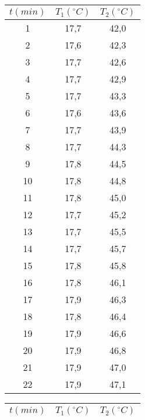 \documentclass[12pt, a4paper, titlepage]{article}
\begin{document}
  \begin{table}[H] 
    \centering
    \begin{minipage}[c]{0,4\textwidth}
      \begin{table}[H]
        \centering
        \begin{tabular}{|c|c|c|}
        \hline
        $t(min)$  & $T_1 (^{\circ} C)$ & $T_2 (^{\circ} C)$ \\ \hline
        1  & 17,7 & 42,0 \\ \hline
        2  & 17,6 & 42,3 \\ \hline
        3  & 17,7 & 42,6 \\ \hline
        4  & 17,7 & 42,9 \\ \hline
        5  & 17,7 & 43,3 \\ \hline
        6  & 17,6 & 43,6 \\ \hline
        7  & 17,7 & 43,9 \\ \hline
        8  & 17,7 & 44,3 \\ \hline
        9  & 17,8 & 44,5 \\ \hline
        10 & 17,8 & 44,8 \\ \hline
        11 & 17,8 & 45,0 \\ \hline
        12 & 17,7 & 45,2 \\ \hline
        13 & 17,7 & 45,5 \\ \hline
        14 & 17,7 & 45,7 \\ \hline
        15 & 17,8 & 45,8 \\ \hline
        16 & 17,8 & 46,1 \\ \hline
        17 & 17,9 & 46,3 \\ \hline
        18 & 17,8 & 46,4 \\ \hline
        19 & 17,9 & 46,6 \\ \hline
        20 & 17,9 & 46,8 \\ \hline
        21 & 17,9 & 47,0 \\ \hline
        22 & 17,9 & 47,1 \\ \hline
        \end{tabular}
      \end{table}
    \end{minipage}
    \begin{minipage}[c]{0,4\textwidth}
      \begin{table}[H]
        \centering
        \begin{tabular}{|c|c|c|}
        \hline
        $t(min)$  & $T_1 (^{\circ} C)$ & $T_2 (^{\circ} C)$ \\ \hline

\end{tabular}
\end{table}
\end{minipage}
\end{table}
\end{document}
